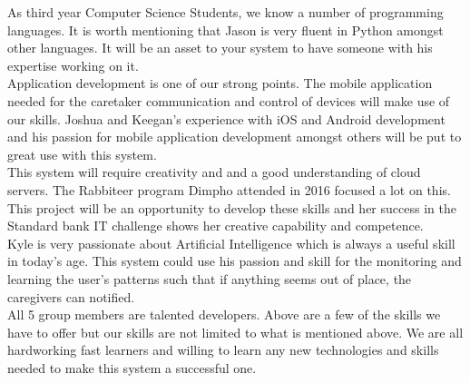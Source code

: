 \documentclass[12pt]{article}
\begin{document}
	As third year Computer Science Students, we know a number of programming languages. It is worth mentioning that Jason is very fluent in Python amongst other languages. It will be an asset to your system to have someone with his expertise working on it.\\
	
	
	Application development is one of our strong points. The mobile application needed for the caretaker communication and control of devices will make use of our skills. Joshua and Keegan's experience with iOS and Android development and his passion for mobile application development amongst others will be put to great use with this system.\\
	
	This system will require creativity and and a good understanding of cloud servers. The Rabbiteer program Dimpho attended in 2016 focused a lot on this. This project will be an opportunity to develop these skills and her success in the Standard bank IT challenge shows her creative capability and competence.\\
	
	Kyle is very passionate about Artificial Intelligence which is always a useful skill in today's age. This system could use his passion and skill for the monitoring and learning the user's patterns such that if anything seems out of place, the caregivers can notified.\\
	
	All 5 group members are talented developers. Above are a few of the skills we have to offer but our skills are not limited to what is mentioned above. We are all hardworking fast learners and willing to learn any new technologies and skills needed to make this system a successful one.
\end{document}
